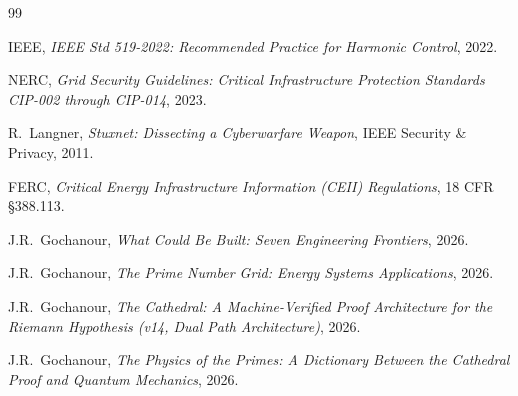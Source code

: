 \documentclass[11pt,a4paper]{article}
\begin{document}
\begin{thebibliography}{99}

IEEE, \emph{IEEE Std 519-2022: Recommended Practice for Harmonic
Control}, 2022.

NERC, \emph{Grid Security Guidelines: Critical Infrastructure
Protection Standards CIP-002 through CIP-014}, 2023.

R.~Langner, \emph{Stuxnet: Dissecting a Cyberwarfare Weapon},
IEEE Security \& Privacy, 2011.

FERC, \emph{Critical Energy Infrastructure Information (CEII)
Regulations}, 18 CFR \S 388.113.

J.R.~Gochanour, \emph{What Could Be Built: Seven Engineering
Frontiers}, 2026.

J.R.~Gochanour, \emph{The Prime Number Grid: Energy Systems
Applications}, 2026.

J.R.~Gochanour, \emph{The Cathedral: A Machine-Verified Proof
Architecture for the Riemann Hypothesis (v14, Dual Path
Architecture)}, 2026.

J.R.~Gochanour, \emph{The Physics of the Primes: A Dictionary
Between the Cathedral Proof and Quantum Mechanics}, 2026.

\end{thebibliography}
\end{document}
